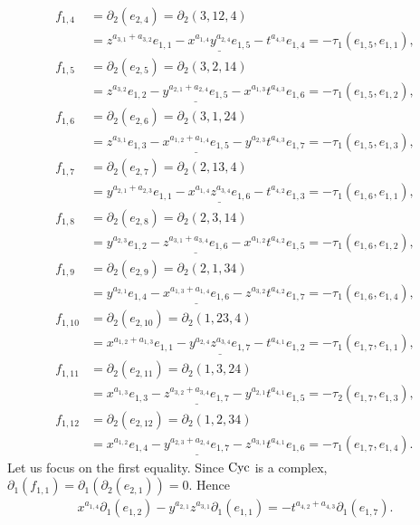 \documentclass[ALCO]{cedram}
\newcommand{\dif}{\mbox{$\partial$}}
\newcommand{\cyc}{\mbox{${\rm Cyc}$}}
\begin{document}
\begin{align*}
f_{1,4}&= \dif_{2}(e_{2,4})=\dif_2(3,12,4)\\
&=z^{a_{3,1}+a_{3,2}}e_{1,1}-\underline{x^{a_{1,4}}y^{a_{2,4}}e_{1,5}}-
t^{a_{4,3}}e_{1,4}=-\tau_1(e_{1,5},e_{1,1}),\\
f_{1,5}&= \dif_{2}(e_{2,5})=\dif_2(3,2,14)\\
&=z^{a_{3,2}}e_{1,2}-\underline{y^{a_{2,1}+a_{2,4}}e_{1,5}}-
x^{a_{1,3}}t^{a_{4,3}}e_{1,6}=-\tau_1(e_{1,5},e_{1,2}),\\
f_{1,6}&= \dif_{2}(e_{2,6})=\dif_2(3,1,24)\\
&=z^{a_{3,1}}e_{1,3}-\underline{x^{a_{1,2}+a_{1,4}}e_{1,5}}-
y^{a_{2,3}}t^{a_{4,3}}e_{1,7}=-\tau_1(e_{1,5},e_{1,3}),\\
f_{1,7}&= \dif_{2}(e_{2,7})=\dif_2(2,13,4)\\
&= y^{a_{2,1}+a_{2,3}}e_{1,1}-\underline{x^{a_{1,4}}z^{a_{3,4}}e_{1,6}}-
t^{a_{4,2}}e_{1,3}=-\tau_1(e_{1,6},e_{1,1}),\\ 
f_{1,8}&= \dif_{2}(e_{2,8})=\dif_2(2,3,14)\\
&=y^{a_{2,3}}e_{1,2}-\underline{z^{a_{3,1}+a_{3,4}}e_{1,6}}-
x^{a_{1,2}}t^{a_{4,2}}e_{1,5}=-\tau_1(e_{1,6},e_{1,2}),\\
f_{1,9}&= \dif_{2}(e_{2,9})=\dif_2(2,1,34)\\ 
&=y^{a_{2,1}}e_{1,4}-\underline{x^{a_{1,3}+a_{1,4}}e_{1,6}}-
z^{a_{3,2}}t^{a_{4,2}}e_{1,7}=-\tau_1(e_{1,6},e_{1,4}),\\
f_{1,10}&= \dif_{2}(e_{2,10})=\dif_2(1,23,4)\\
&= x^{a_{1,2}+a_{1,3}}e_{1,1}-\underline{y^{a_{2,4}}z^{a_{3,4}}e_{1,7}}-
t^{a_{4,1}}e_{1,2}=-\tau_1(e_{1,7},e_{1,1}),\\
f_{1,11}&= \dif_{2}(e_{2,11})=\dif_2(1,3,24)\\
&= x^{a_{1,3}}e_{1,3}-\underline{z^{a_{3,2}+a_{3,4}}e_{1,7}}-
y^{a_{2,1}}t^{a_{4,1}}e_{1,5}=-\tau_2(e_{1,7},e_{1,3}),\\
f_{1,12}&= \dif_{2}(e_{2,12})=\dif_2(1,2,34)\\ 
&= x^{a_{1,2}}e_{1,4}-\underline{y^{a_{2,3}+a_{2,4}}e_{1,7}}-
z^{a_{3,1}}t^{a_{4,1}}e_{1,6}=-\tau_1(e_{1,7},e_{1,4}).
\end{align*}
Let us focus on the first equality. Since $\cyc$ is a complex,
$\dif_1(f_{1,1})=\dif_1(\dif_2(e_{2,1}))=0$. Hence
\begin{eqnarray*}
x^{a_{1,4}}\dif_1(e_{1,2})-y^{a_{2,1}}z^{a_{3,1}}\dif_1(e_{1,1})=
-t^{a_{4,2}+a_{4,3}}\dif_1(e_{1,7}).
\end{eqnarray*}
\end{document}
